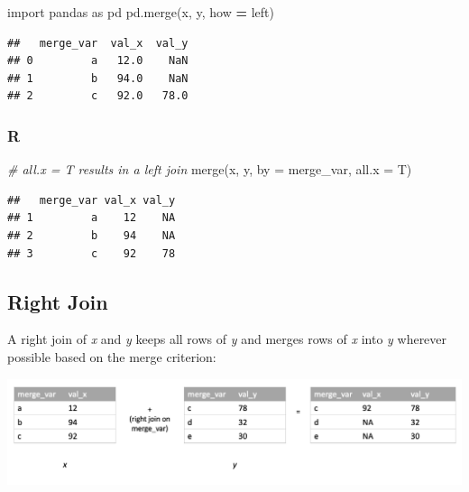 \documentclass[
]{book}
\newenvironment{Shaded}{\begin{snugshade}}{\end{snugshade}}
\newcommand{\AttributeTok}[1]{\textcolor[rgb]{0.77,0.63,0.00}{#1}}
\newcommand{\CommentTok}[1]{\textcolor[rgb]{0.56,0.35,0.01}{\textit{#1}}}
\newcommand{\FunctionTok}[1]{\textcolor[rgb]{0.00,0.00,0.00}{#1}}
\newcommand{\ImportTok}[1]{#1}
\newcommand{\NormalTok}[1]{#1}
\newcommand{\OperatorTok}[1]{\textcolor[rgb]{0.81,0.36,0.00}{\textbf{#1}}}
\newcommand{\StringTok}[1]{\textcolor[rgb]{0.31,0.60,0.02}{#1}}
\begin{document}
\begin{Shaded}
\begin{Highlighting}[]
\ImportTok{import}\NormalTok{ pandas }\ImportTok{as}\NormalTok{ pd}
\NormalTok{pd.merge(x, y, how }\OperatorTok{=} \StringTok{\textquotesingle{}left\textquotesingle{}}\NormalTok{)}
\end{Highlighting}
\end{Shaded}

\begin{verbatim}
##   merge_var  val_x  val_y
## 0         a   12.0    NaN
## 1         b   94.0    NaN
## 2         c   92.0   78.0
\end{verbatim}

\hypertarget{r-34}{%
\subsubsection*{R}\label{r-34}}

\begin{Shaded}
\begin{Highlighting}[]
\CommentTok{\# all.x = T results in a left join}
\FunctionTok{merge}\NormalTok{(x, y, }\AttributeTok{by =} \StringTok{\textquotesingle{}merge\_var\textquotesingle{}}\NormalTok{, }\AttributeTok{all.x =}\NormalTok{ T)}
\end{Highlighting}
\end{Shaded}

\begin{verbatim}
##   merge_var val_x val_y
## 1         a    12    NA
## 2         b    94    NA
## 3         c    92    78
\end{verbatim}

\hypertarget{right-join}{%
\subsection{Right Join}\label{right-join}}

A right join of \emph{x} and \emph{y} keeps all rows of \emph{y} and merges rows of \emph{x} into \emph{y} wherever possible based on the merge criterion:

\includegraphics[width=17.25in]{images/right_join}
\end{document}
